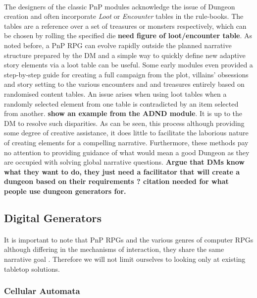 \documentclass{UoYCSproject}
\begin{document}
\paragraph{}
The designers of the classic PnP modules acknowledge the issue of Dungeon creation and often incorporate \textit{Loot} or \textit{Encounter} tables in the rule-books. The tables are a reference over a set of treasures or monsters respectively, which can be chosen by rolling the specified die \textbf{need figure of loot/encounter table}. As noted before, a PnP RPG can evolve rapidly outside the planned narrative structure prepared by the DM and a simple way to quickly define new adaptive story elements via a loot table can be useful. Some early modules even provided a step-by-step guide for creating a full campaign from the plot, villains' obsessions and story setting to the various encounters and and treasures \parencite{ADnD} entirely based on randomised content tables. An issue arises when using loot tables when a randomly selected element from one table is contradicted by an item selected from another. \textbf{show an example from the ADND module}. It is up to the DM to resolve such disparities. As can be seen, this process although providing some degree of creative assistance, it does little to facilitate the laborious nature of creating elements for a compelling narrative. Furthermore, these methods pay no attention to providing guidance of what would mean a good Dungeon as they are occupied with solving global narrative questions. \textbf{Argue that DMs know what they want to do, they just need a facilitator that will create a dungeon based on their requirements ? citation needed for what people use dungeon generators for.}

\subsection{Digital Generators}
\paragraph{}
It is important to note that PnP RPGs and the various genres of computer RPGs although differing in the mechanisms of interaction, they share the same narrative goal \parencite{Tychsen2006}. Therefore we will not limit ourselves to looking only at existing tabletop solutions.

\subsubsection{Cellular Automata}
\end{document}
